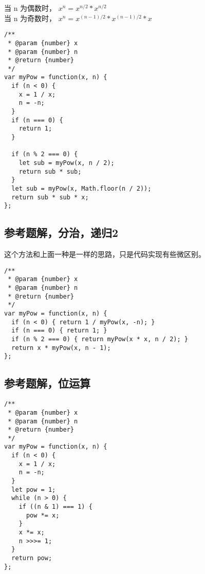 当 n 为偶数时， $x^{n} = x^{n/2} * x^{n/2}$ \\
当 n 为奇数时， $x^{n} = x^{(n-1)/2} * x^{(n-1)/2} * x$ 

\begin{verbatim}
/**
 * @param {number} x
 * @param {number} n
 * @return {number}
 */
var myPow = function(x, n) {
  if (n < 0) {
    x = 1 / x;
    n = -n;
  }
  if (n === 0) {
    return 1;
  }

  if (n % 2 === 0) {
    let sub = myPow(x, n / 2);
    return sub * sub;
  }
  let sub = myPow(x, Math.floor(n / 2));
  return sub * sub * x;
};
\end{verbatim}

\subsection{参考题解，分治，递归2}

这个方法和上面一种是一样的思路，只是代码实现有些微区别。

\begin{verbatim}
/**
 * @param {number} x
 * @param {number} n
 * @return {number}
 */
var myPow = function(x, n) {
  if (n < 0) { return 1 / myPow(x, -n); }
  if (n === 0) { return 1; }
  if (n % 2 === 0) { return myPow(x * x, n / 2); }
  return x * myPow(x, n - 1);
};
\end{verbatim}

\subsection{参考题解，位运算}

\begin{verbatim}
/**
 * @param {number} x
 * @param {number} n
 * @return {number}
 */
var myPow = function(x, n) {
  if (n < 0) {
    x = 1 / x;
    n = -n;
  }
  let pow = 1;
  while (n > 0) {
    if ((n & 1) === 1) {
      pow *= x;
    }
    x *= x;
    n >>>= 1;
  }
  return pow;
};
\end{verbatim}
